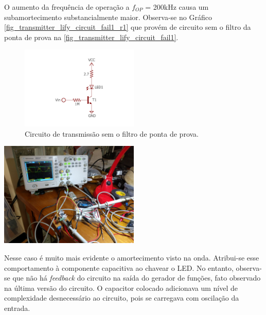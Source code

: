 	O aumento da frequência de operação a $f_{OP}$ = 200kHz causa um subamortecimento substancialmente maior. Observa-se no Gráfico \ref{fig_transmitter_lify_circuit_fail1_r1} que provém de circuito sem o filtro da ponta de prova na \autoref{fig_transmitter_lify_circuit_fail1}.
	\begin{figure}[h!]
		\caption{\label{fig_transmitter_lify_circuit_fail1}Circuito de transmissão sem o filtro de ponta de prova.}
		\centering
		\includegraphics[width=0.5\textwidth, trim={2cm 2cm 2cm 2.3cm}, clip]{circuits/transmitter_fail1.pdf}
	\end{figure}
	\begin{chart}[h!]
		\caption{\label{fig_transmitter_lify_circuit_fail1_r1}Operação de circuito transmissor sem ponta de prova. A onda amarela representa voltagem no LED sem filtro de ponta de prova em frequências mais altas. O gerador de funções é medido e gera a forma de onda verde.}
		\centering
		\includegraphics[width=0.5\textwidth, trim={22.5cm 69cm 87cm 16cm}, clip]{circuits/photos/TX_200k_without_filter.jpg}
	\end{chart}
	Nesse caso é muito mais evidente o amortecimento visto na onda. Atribui-se esse comportamento à componente capacitiva ao chavear o LED. No entanto, observa-se que não há \textit{feedback} do circuito na saída do gerador de funções, fato observado na última versão do circuito. O capacitor colocado adicionava um nível de complexidade desnecessário ao circuito, pois se carregava com oscilação da entrada.

